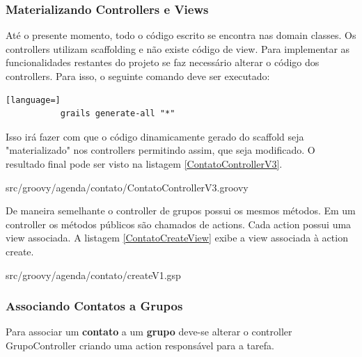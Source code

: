 \documentclass[12pt]{article}
\begin{document}
\subsubsection{Materializando Controllers e Views}
    
    Até o presente momento, todo o código escrito se encontra nas domain classes.
    Os controllers utilizam scaffolding e não existe código de view. Para implementar
    as funcionalidades restantes do projeto se faz necessário alterar o código dos
    controllers. Para isso, o seguinte comando deve ser executado:
    
    \begin{lstlisting}[language=]
           grails generate-all "*"
    \end{lstlisting}
    
    Isso irá fazer com que o código dinamicamente gerado do scaffold seja "materializado"
    nos controllers permitindo assim, que seja modificado. O resultado final pode
    ser visto na listagem \ref{ContatoControllerV3}.
    
    
                   {src/groovy/agenda/contato/ContatoControllerV3.groovy}
    
    De maneira semelhante o controller de grupos possui os mesmos métodos. Em um
    controller os métodos públicos são chamados de actions. Cada action possui uma
    view associada. A listagem \ref{ContatoCreateView} exibe a view associada à
    action create.
    
    
                   {src/groovy/agenda/contato/createV1.gsp}
    
\subsubsection{Associando Contatos a Grupos}

    Para associar um \textbf{contato} a um \textbf{grupo} deve-se alterar o controller
    GrupoController criando uma action responsável para a tarefa.
    
\end{document}
